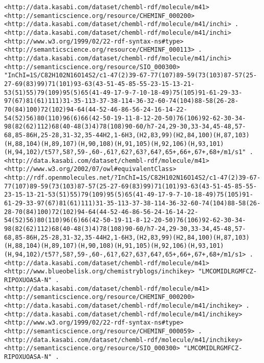 \documentclass[sw]{iosart2c}
\begin{document}
\begin{tiny}
\begin{verbatim}
<http://data.kasabi.com/dataset/chembl-rdf/molecule/m41> <http://semanticscience.org/resource/CHEMINF_000200> <http://data.kasabi.com/dataset/chembl-rdf/molecule/m41/inchi> .
<http://data.kasabi.com/dataset/chembl-rdf/molecule/m41/inchi> <http://www.w3.org/1999/02/22-rdf-syntax-ns#type> <http://semanticscience.org/resource/CHEMINF_000113> .
<http://data.kasabi.com/dataset/chembl-rdf/molecule/m41/inchi> <http://semanticscience.org/resource/SIO_000300> "InChI=1S/C82H102N16O14S2/c1-47(2)39-67-77(107)89-59(73(103)87-57(25-27-69(83)99)71(101)93-63(43-51-45-85-55-23-15-13-21-53(51)55)79(109)95(5)65(41-49-17-9-7-10-18-49)75(105)91-61-29-33-97(67)81(61)111)31-35-113-37-38-114-36-32-60-74(104)88-58(26-28-70(84)100)72(102)94-64(44-52-46-86-56-24-16-14-22-54(52)56)80(110)96(6)66(42-50-19-11-8-12-20-50)76(106)92-62-30-34-98(82(62)112)68(40-48(3)4)78(108)90-60/h7-24,29-30,33-34,45-48,57-68,85-86H,25-28,31-32,35-44H2,1-6H3,(H2,83,99)(H2,84,100)(H,87,103)(H,88,104)(H,89,107)(H,90,108)(H,91,105)(H,92,106)(H,93,101)(H,94,102)/t57?,58?,59-,60-,61?,62?,63?,64?,65+,66+,67+,68+/m1/s1" .
<http://data.kasabi.com/dataset/chembl-rdf/molecule/m41> <http://www.w3.org/2002/07/owl#equivalentClass> <http://rdf.openmolecules.net/?InChI=1S/C82H102N16O14S2/c1-47(2)39-67-77(107)89-59(73(103)87-57(25-27-69(83)99)71(101)93-63(43-51-45-85-55-23-15-13-21-53(51)55)79(109)95(5)65(41-49-17-9-7-10-18-49)75(105)91-61-29-33-97(67)81(61)111)31-35-113-37-38-114-36-32-60-74(104)88-58(26-28-70(84)100)72(102)94-64(44-52-46-86-56-24-16-14-22-54(52)56)80(110)96(6)66(42-50-19-11-8-12-20-50)76(106)92-62-30-34-98(82(62)112)68(40-48(3)4)78(108)90-60/h7-24,29-30,33-34,45-48,57-68,85-86H,25-28,31-32,35-44H2,1-6H3,(H2,83,99)(H2,84,100)(H,87,103)(H,88,104)(H,89,107)(H,90,108)(H,91,105)(H,92,106)(H,93,101)(H,94,102)/t57?,58?,59-,60-,61?,62?,63?,64?,65+,66+,67+,68+/m1/s1> .
<http://data.kasabi.com/dataset/chembl-rdf/molecule/m41> <http://www.blueobelisk.org/chemistryblogs/inchikey> "LMCOMIDLRGMFCZ-RIPOXUOASA-N" .
<http://data.kasabi.com/dataset/chembl-rdf/molecule/m41> <http://semanticscience.org/resource/CHEMINF_000200> <http://data.kasabi.com/dataset/chembl-rdf/molecule/m41/inchikey> .
<http://data.kasabi.com/dataset/chembl-rdf/molecule/m41/inchikey> <http://www.w3.org/1999/02/22-rdf-syntax-ns#type> <http://semanticscience.org/resource/CHEMINF_000059> .
<http://data.kasabi.com/dataset/chembl-rdf/molecule/m41/inchikey> <http://semanticscience.org/resource/SIO_000300> "LMCOMIDLRGMFCZ-RIPOXUOASA-N" .
\end{verbatim}
\end{tiny}
\end{document}
